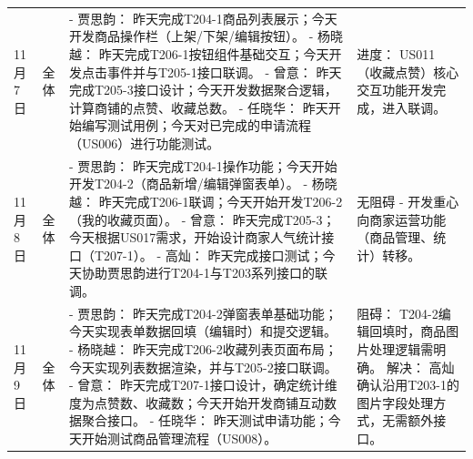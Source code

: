 \begin{levellist}
\begin{longtable}{>{\centering\arraybackslash}m{1cm} >{\centering\arraybackslash}m{1cm} >{\centering\arraybackslash}m{9cm} >{\centering\arraybackslash}m{2.5cm}}
        11月7日                                                   & 全体                                                     & - 贾思韵： 昨天完成T204-1商品列表展示；今天开发商品操作栏（上架/下架/编辑按钮）。 \newline
        - 杨晓越： 昨天完成T206-1按钮组件基础交互；今天开发点击事件并与T205-1接口联调。 \newline
        - 曾意： 昨天完成T205-3接口设计；今天开发数据聚合逻辑，计算商铺的点赞、收藏总数。 \newline
        - 任晓华： 昨天开始编写测试用例；今天对已完成的申请流程（US006）进行功能测试。             & 进度： US011（收藏点赞）核心交互功能开发完成，进入联调。                                                                                                                     \\
        11月8日                                                   & 全体                                                     & - 贾思韵： 昨天完成T204-1操作功能；今天开始开发T204-2（商品新增/编辑弹窗表单）。 \newline
        - 杨晓越： 昨天完成T206-1联调；今天开始开发T206-2（我的收藏页面）。 \newline
        - 曾意： 昨天完成T205-3；今天根据US017需求，开始设计商家人气统计接口（T207-1）。 \newline
        - 高灿： 昨天完成接口测试；今天协助贾思韵进行T204-1与T203系列接口的联调。             & 无阻碍 - 开发重心向商家运营功能（商品管理、统计）转移。                                                                                                                       \\
        11月9日                                                   & 全体                                                     & - 贾思韵： 昨天完成T204-2弹窗表单基础功能；今天实现表单数据回填（编辑时）和提交逻辑。 \newline
        - 杨晓越： 昨天完成T206-2收藏列表页面布局；今天实现列表数据渲染，并与T205-2接口联调。 \newline
        - 曾意： 昨天完成T207-1接口设计，确定统计维度为点赞数、收藏数；今天开始开发商铺互动数据聚合接口。 \newline
        - 任晓华： 昨天测试申请功能；今天开始测试商品管理流程（US008）。                    & 阻碍： T204-2编辑回填时，商品图片处理逻辑需明确。 \newline
        解决： 高灿确认沿用T203-1的图片字段处理方式，无需额外接口。                                                                                                                                                                             \\

\end{longtable}
\end{levellist}
